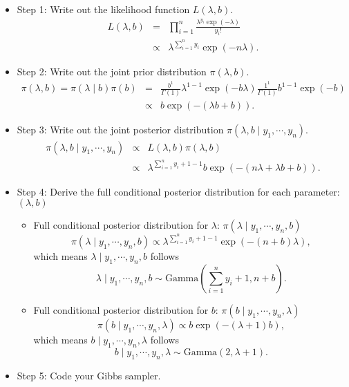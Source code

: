 \documentclass[11pt]{article}
\begin{document}
\begin{itemize}
\item Step 1: Write out the likelihood function $L(\lambda, b)$.
\begin{eqnarray*}
L(\lambda, b) &=& \prod_{i=1}^{n} \frac{\lambda^{y_i}\exp(-\lambda)}{y_i!} \\
&\propto& \lambda^{\sum_{i=1}^{n} y_i} \exp(-n\lambda).
\end{eqnarray*}

\item Step 2: Write out the joint prior distribution $\pi(\lambda, b) $.
\begin{eqnarray*}
\pi(\lambda, b) = \pi(\lambda \mid b) \pi(b) &=&  \frac{b^1}{\Gamma(1)}\lambda^{1-1}\exp(-b\lambda)  \frac{1^1}{\Gamma(1)}b^{1-1}\exp(-b) \\
&\propto& b\exp(-(\lambda b+ b)).
\end{eqnarray*}

\item Step 3: Write out the joint posterior distribution $\pi(\lambda, b \mid y_1, \cdots, y_n)$.
\begin{eqnarray*}
\pi(\lambda, b \mid y_1, \cdots, y_n) &\propto& L(\lambda, b) \pi(\lambda, b) \\
&\propto& \lambda^{\sum_{i=1}^{n}y_i + 1 - 1} b \exp(-(n\lambda + \lambda b + b)).
\end{eqnarray*}

\item Step 4: Derive the full conditional posterior distribution for each parameter: $(\lambda, b)$
\begin{itemize}
\item Full conditional posterior distribution for $\lambda$: $\pi(\lambda \mid y_1, \cdots, y_n, b)$
\begin{equation}
\pi(\lambda \mid y_1, \cdots, y_n, b) \propto \lambda^{\sum_{i=1}^{n} y_i + 1 - 1} \exp(-(n+b)\lambda),
\end{equation}
which means $\lambda \mid y_1, \cdots, y_n, b$ follows
\begin{equation*}
\lambda \mid y_1, \cdots, y_n, b \sim \textrm{Gamma}(\sum_{i=1}^{n} y_i + 1, n + b).
\end{equation*}

\item Full conditional posterior distribution for $b$: $\pi(b \mid y_1, \cdots, y_n, \lambda)$
\begin{equation}
\pi(b \mid y_1, \cdots, y_n, \lambda) \propto b  \exp(-(\lambda+1)b),
\end{equation}
which means $b \mid y_1, \cdots, y_n, \lambda$ follows
\begin{equation*}
b \mid y_1, \cdots, y_n, \lambda \sim \textrm{Gamma}(2, \lambda + 1).
\end{equation*}
\end{itemize}

\item Step 5: Code your Gibbs sampler.

\end{itemize}
\end{document}
